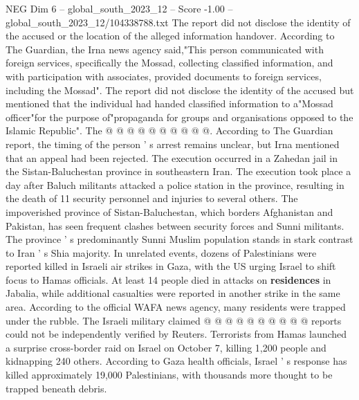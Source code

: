 \begin{textsample}{NEG Dim 6 – global\_south\_2023\_12 – Score -1.00 – global\_south\_2023\_12/104338788.txt}
The report did not disclose the identity of the accused or the location of the alleged information handover.
According to The Guardian, the Irna news agency said,"This person communicated with foreign services, specifically the Mossad, collecting classified information, and with participation with associates, provided documents to foreign services, including the Mossad".
The report did not disclose the identity of the accused but mentioned that the individual had handed classified information to a"Mossad officer"for the purpose of"propaganda for groups and organisations opposed to the Islamic Republic".
The @ @ @ @ @ @ @ @ @ @.
According to The Guardian report, the timing of the person ' s arrest remains unclear, but Irna mentioned that an appeal had been rejected.
The execution occurred in a Zahedan jail in the Sistan-Baluchestan province in southeastern Iran.
The execution took place a day after Baluch militants attacked a police station in the province, resulting in the death of 11 security personnel and injuries to several others.
The impoverished province of Sistan-Baluchestan, which borders Afghanistan and Pakistan, has seen frequent clashes between security forces and Sunni militants.
The province ' s predominantly Sunni Muslim population stands in stark contrast to Iran ' s Shia majority.
In unrelated events, dozens of Palestinians were reported killed in Israeli air strikes in Gaza, with the US urging Israel to shift focus to Hamas officials.
At least 14 people died in attacks on \textbf{residences} in Jabalia, while additional casualties were reported in another strike in the same area.
According to the official WAFA news agency, many residents were trapped under the rubble.
The Israeli military claimed @ @ @ @ @ @ @ @ @ @ reports could not be independently verified by Reuters.
Terrorists from Hamas launched a surprise cross-border raid on Israel on October 7, killing 1,200 people and kidnapping 240 others.
According to Gaza health officials, Israel ' s response has killed approximately 19,000 Palestinians, with thousands more thought to be trapped beneath debris.

\end{textsample}
